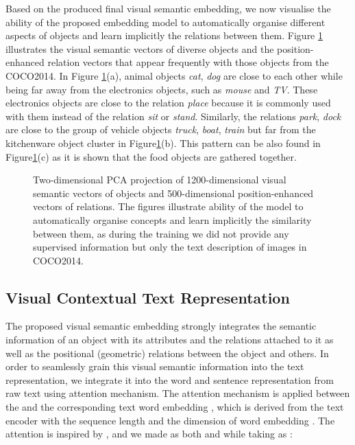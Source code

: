 \documentclass[11pt]{article}
\begin{document}
Based on the produced final visual semantic embedding, we now visualise the ability of the proposed embedding model to automatically organise different aspects of objects and learn implicitly the relations between them. Figure \ref{fig:embed_plot} illustrates the visual semantic vectors of diverse objects and the position-enhanced relation vectors that appear frequently with those objects from the COCO2014. In Figure \ref{fig:embed_plot}(a), animal objects \textit{cat}, \textit{dog} are close to each other while being far away from the electronics objects, such as \textit{mouse} and \textit{TV}. These electronics objects are close to the relation \textit{place} because it is commonly used with them instead of the relation \textit{sit} or \textit{stand}. Similarly, the relations \textit{park}, \textit{dock} are close to the group of vehicle objects \textit{truck}, \textit{boat}, \textit{train} but far from the kitchenware object cluster in Figure\ref{fig:embed_plot}(b). This pattern can be also found in Figure\ref{fig:embed_plot}(c) as it is shown that the food objects are gathered together.




\begin{figure}[t]
\centering
{}
\label{fig:subfig2}

\label{fig:subfig3}

\caption[]{Two-dimensional PCA projection of 1200-dimensional visual semantic vectors of objects and 500-dimensional position-enhanced vectors of relations. The figures illustrate ability of the model to automatically organise concepts and learn implicitly the similarity between them, as during the training we did not provide any supervised information but only the text description of images in COCO2014.}
\label{fig:embed_plot}
\end{figure}




\subsection{Visual Contextual Text Representation}
The proposed visual semantic embedding strongly integrates the semantic information of an object with its attributes and the relations attached to it as well as the positional (geometric) relations between the object and others. In order to seamlessly grain this visual semantic information into the text representation, we integrate it into the word and sentence representation from raw text using attention mechanism. The attention mechanism is applied between the  and the corresponding text word embedding , which is derived from the text encoder with the sequence length  and the dimension of word embedding . The attention is inspired by \cite{vaswani2017attention}, and we made  as both  and  while taking  as :
\end{document}
